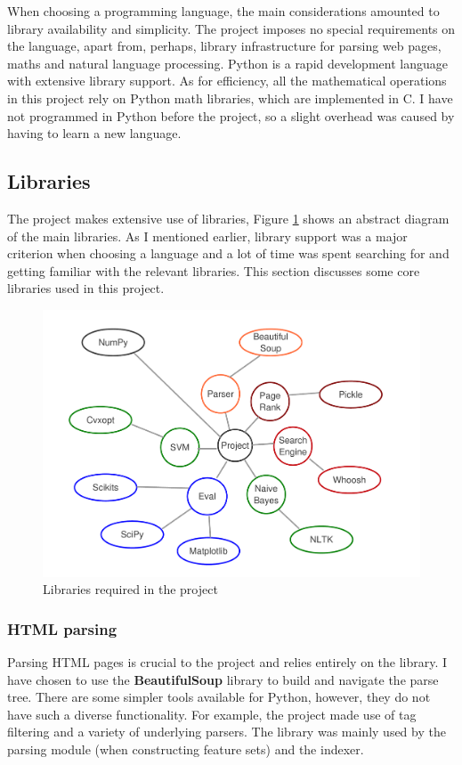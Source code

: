 \documentclass[12pt,notitlepage,twoside]{scrreprt}
\begin{document}
When choosing a programming language, the main considerations amounted to library availability
and simplicity. The project imposes no special requirements on the language, apart from,
perhaps, library infrastructure for parsing web pages, maths and natural language
processing.  Python is a rapid development language with extensive library support. As for
efficiency, all the mathematical operations in this project rely on Python math libraries,
which are implemented in C. I have not programmed in Python before the project, so a
slight overhead was caused by having to learn a new language.

\subsection{Libraries}
The project makes extensive use of libraries, Figure \ref{libs} shows an abstract diagram
of the main libraries. As I mentioned earlier, library support was a major criterion when
choosing a language and a lot of time was spent searching for and getting familiar with the
relevant libraries. This section discusses some core libraries used in this project.

\begin{figure}[h]
	\centering
	\includegraphics[width=\textwidth]{figs/libs.pdf}
	\caption{Libraries required in the project\label{libs}}
\end{figure}
\subsubsection*{HTML parsing}
Parsing HTML pages is crucial to the project and relies entirely on the library. I have
chosen to use the \textbf{BeautifulSoup} library to build and navigate the parse tree.
There are some simpler tools available for Python, however, they do not have such a
diverse functionality. For example, the project made use of tag filtering and a
variety of underlying parsers. The library was mainly used by the parsing module (when
constructing feature sets) and the indexer.
\end{document}
